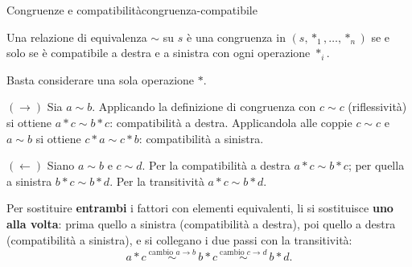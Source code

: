 \begin{concetto}
\begin{Teorema}{Congruenze e compatibilità}{congruenza-compatibile}
    \begin{prerequisiti}
    \end{prerequisiti}
    Una relazione di equivalenza $\sim$ su $s$ è una congruenza in $(s, *_1, \dots, *_n)$ se e solo se è compatibile a destra e a sinistra
    con ogni operazione $*_i$.
\end{Teorema}
\begin{dimostrazione}
    Basta considerare una sola operazione $*$.
    \begin{caso}{$(\rightarrow)$}
        Sia $a \sim b$. Applicando la definizione di congruenza con $c \sim c$ (riflessività) si ottiene $a * c \sim b * c$: compatibilità a destra.
        Applicandola alle coppie $c \sim c$ e $a \sim b$ si ottiene $c * a \sim c * b$: compatibilità a sinistra.
    \end{caso}
    \begin{caso}{$(\leftarrow)$}
        Siano $a \sim b$ e $c \sim d$. Per la compatibilità a destra $a * c \sim b * c$; per quella a sinistra $b * c \sim b * d$. Per la
        transitività $a * c \sim b * d$.
    \end{caso}
\end{dimostrazione}
\end{concetto}

\begin{spiegazione}
    Per sostituire \textbf{entrambi} i fattori con elementi equivalenti, li si sostituisce \textbf{uno alla volta}: prima quello a sinistra
    (compatibilità a destra), poi quello a destra (compatibilità a sinistra), e si collegano i due passi con la transitività:
    \[ a * c \ \overset{\text{cambio } a \to b}{\sim}\ b * c \ \overset{\text{cambio } c \to d}{\sim}\ b * d. \]
\end{spiegazione}

